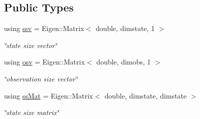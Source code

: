 \subsection*{Public Types}
\begin{DoxyCompactItemize}
\item 
using \hyperlink{classpf_1_1hmm_a62885209a039ac5483ccc4d07337f901}{ssv} = Eigen\+::\+Matrix$<$ double, dimstate, 1 $>$\hypertarget{classpf_1_1hmm_a62885209a039ac5483ccc4d07337f901}{}\label{classpf_1_1hmm_a62885209a039ac5483ccc4d07337f901}

\begin{DoxyCompactList}\small\item\em \char`\"{}state size vector\char`\"{} \end{DoxyCompactList}\item 
using \hyperlink{classpf_1_1hmm_a0c2ddb935318a9c320c9808e7820a9cb}{osv} = Eigen\+::\+Matrix$<$ double, dimobs, 1 $>$\hypertarget{classpf_1_1hmm_a0c2ddb935318a9c320c9808e7820a9cb}{}\label{classpf_1_1hmm_a0c2ddb935318a9c320c9808e7820a9cb}

\begin{DoxyCompactList}\small\item\em \char`\"{}observation size vector\char`\"{} \end{DoxyCompactList}\item 
using \hyperlink{classpf_1_1hmm_aa6e481316a30758d0eae33dbc8b5e8b5}{ss\+Mat} = Eigen\+::\+Matrix$<$ double, dimstate, dimstate $>$\hypertarget{classpf_1_1hmm_aa6e481316a30758d0eae33dbc8b5e8b5}{}\label{classpf_1_1hmm_aa6e481316a30758d0eae33dbc8b5e8b5}

\begin{DoxyCompactList}\small\item\em \char`\"{}state size matrix\char`\"{} \end{DoxyCompactList}\end{DoxyCompactItemize}
